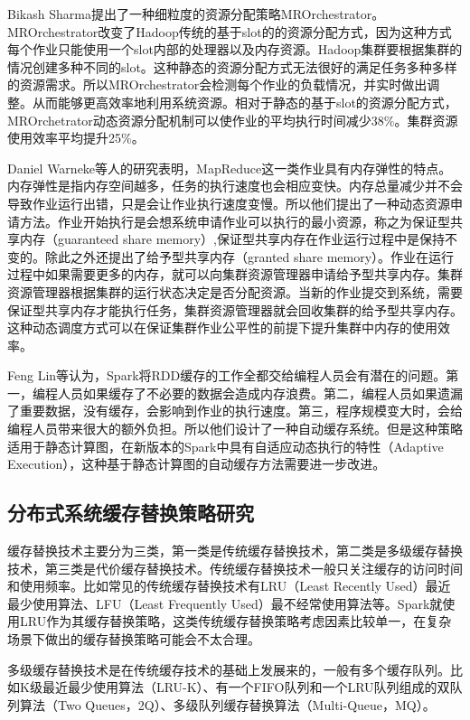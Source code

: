 Bikash Sharma提出了一种细粒度的资源分配策略MROrchestrator\cite{6253482}。MROrchestrator改变了Hadoop传统的基于slot的的资源分配方式，因为这种方式每个作业只能使用一个slot内部的处理器以及内存资源。Hadoop集群要根据集群的情况创建多种不同的slot。这种静态的资源分配方式无法很好的满足任务多种多样的资源需求。所以MROrchestrator会检测每个作业的负载情况，并实时做出调整。从而能够更高效率地利用系统资源。相对于静态的基于slot的资源分配方式，MROrchetrator动态资源分配机制可以使作业的平均执行时间减少38\%。集群资源使用效率平均提升25\%。

Daniel Warneke等人\cite{5710902}的研究表明，MapReduce这一类作业具有内存弹性的特点。内存弹性是指内存空间越多，任务的执行速度也会相应变快。内存总量减少并不会导致作业运行出错，只是会让作业执行速度变慢。所以他们提出了一种动态资源申请方法。作业开始执行是会想系统申请作业可以执行的最小资源，称之为保证型共享内存（guaranteed share memory）,保证型共享内存在作业运行过程中是保持不变的。除此之外还提出了给予型共享内存（granted share memory）。作业在运行过程中如果需要更多的内存，就可以向集群资源管理器申请给予型共享内存。集群资源管理器根据集群的运行状态决定是否分配资源。当新的作业提交到系统，需要保证型共享内存才能执行任务，集群资源管理器就会回收集群的给予型共享内存。这种动态调度方式可以在保证集群作业公平性的前提下提升集群中内存的使用效率。

Feng Lin等\cite{冯琳0集群计算引擎}认为，Spark将RDD缓存的工作全都交给编程人员会有潜在的问题。第一，编程人员如果缓存了不必要的数据会造成内存浪费。第二，编程人员如果遗漏了重要数据，没有缓存，会影响到作业的执行速度。第三，程序规模变大时，会给编程人员带来很大的额外负担。所以他们设计了一种自动缓存系统。但是这种策略适用于静态计算图，在新版本的Spark中具有自适应动态执行的特性（Adaptive Execution），这种基于静态计算图的自动缓存方法需要进一步改进。

\subsection{分布式系统缓存替换策略研究}

缓存替换技术主要分为三类，第一类是传统缓存替换技术，第二类是多级缓存替换技术，第三类是代价缓存替换技术。传统缓存替换技术一般只关注缓存的访问时间和使用频率。比如常见的传统缓存替换技术有LRU（Least Recently Used）最近最少使用算法、LFU（Least Frequently Used）最不经常使用算法等。Spark就使用LRU作为其缓存替换策略，这类传统缓存替换策略考虑因素比较单一，在复杂场景下做出的缓存替换策略可能会不太合理。

多级缓存替换技术是在传统缓存技术的基础上发展来的，一般有多个缓存队列。比如K级最近最少使用算法（LRU-K\cite{o1993lru}）、有一个FIFO队列和一个LRU队列组成的双队列算法（Two Queues，2Q\cite{dimitriou2015retrial}）、多级队列缓存替换算法（Multi-Queue，MQ\cite{li2015sparkbench}）。

